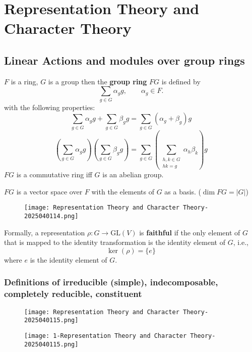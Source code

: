 \section{Representation Theory and Character Theory}

\subsection{Linear Actions and modules over group rings}

$F$ is a ring, $G$ is a group then the \textbf{group ring} $FG$ is defined by
\[
\sum_{g\in G}\alpha_{g}g,\qquad \alpha_{g}\in F.
\]
with the following properties:
\[
\sum_{g\in G}\alpha_{g}g+\sum_{g\in G}\beta_{g}g=\sum_{g\in G}(\alpha_{g}+\beta_{g})g
\]
\[
\left( \sum_{g\in G}\alpha_{g}g \right)\left( \sum_{g\in G}\beta_{g}g \right)=\sum_{g\in G}\left( \sum_{\substack{h,k\in G\\hk=g}}\alpha_{h}\beta_{k} \right)g
\]
$FG$ is a commutative ring iff $G$ is an abelian group.

$FG$ is a vector space over $F$ with the elements of $G$ as a basis. ($\dim FG=\lvert G \rvert$)

\begin{figure}[H]
\centering
\texttt{[image: Representation Theory and Character Theory-2025040114.png]}
\label{}
\end{figure}

Formally, a representation $\rho: G \rightarrow \mathrm{GL}(V)$ is \textbf{faithful} if the only element of $G$ that is mapped to the identity transformation is the identity element of $G$, i.e.,
\[
\operatorname{ker}(\rho)=\{e\}
\]
where $e$ is the identity element of $G$.

\subsubsection{Definitions of irreducible (simple), indecomposable, completely reducible, constituent}

\begin{figure}[H]
\centering
\texttt{[image: Representation Theory and Character Theory-2025040115.png]}
\label{}
\end{figure}

\begin{figure}[H]
\centering
\texttt{[image: 1-Representation Theory and Character Theory-2025040115.png]}
\label{}
\end{figure}

